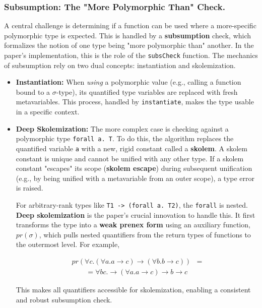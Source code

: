\subsubsection{Subsumption: The "More Polymorphic Than" Check.}
A central challenge is determining if a function can be used where a more-specific polymorphic type is expected. This is handled by a \textbf{subsumption} check, which formalizes the notion of one type being "more polymorphic than" another. In the paper's implementation, this is the role of the \texttt{subsCheck} function. The mechanics of subsumption rely on two dual concepts: instantiation and skolemization.

\begin{itemize}
    \item \textbf{Instantiation:} When \textit{using} a polymorphic value (e.g., calling a function bound to a $\sigma$-type), its quantified type variables are replaced with fresh metavariables. This process, handled by \texttt{instantiate}, makes the type usable in a specific context.

    \item \textbf{Deep Skolemization:} The more complex case is checking against a polymorphic type \texttt{forall a. T}. To do this, the algorithm replaces the quantified variable \texttt{a} with a new, rigid constant called a \textbf{skolem}. A skolem constant is unique and cannot be unified with any other type. If a skolem constant "escapes" its scope (\textbf{skolem escape}) during subsequent unification (e.g., by being unified with a metavariable from an outer scope), a type error is raised.

          For arbitrary-rank types like \texttt{T1 -> (forall a. T2)}, the \texttt{forall} is nested. \textbf{Deep skolemization} is the paper's crucial innovation to handle this. It first transforms the type into a \textbf{weak prenex form} using an auxiliary function, $pr(\sigma)$, which pulls nested quantifiers from the return types of functions to the outermost level. For example,

          \begin{equation}
              \begin{split}
                  pr(\forall c. (\forall a. a \rightarrow c) \rightarrow (\forall b. b \rightarrow c)) & = \\
                  \quad \quad =\forall b c. \rightarrow (\forall a. a \rightarrow c) \rightarrow b \rightarrow c
              \end{split}
          \end{equation}

          This makes all quantifiers accessible for skolemization, enabling a consistent and robust subsumption check.
\end{itemize}


